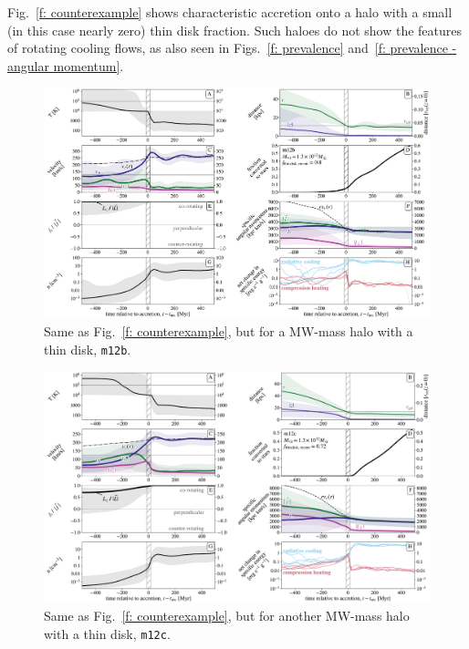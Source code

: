 \documentclass[fleqn,usenatbib]{mnras}
\begin{document}
Fig.~\ref{f: counterexample} shows characteristic accretion onto a halo with a small (in this case nearly zero) thin disk fraction.
Such haloes do not show the features of rotating cooling flows, as also seen in Figs.~\ref{f: prevalence} and~\ref{f: prevalence - angular momentum}.


\begin{figure}
\includegraphics[width=\textwidth]{figures/variations/relative_to_accretion/before_and_after/before_and_after_allone_m12b_md.pdf}
\caption{
Same as Fig.~\ref{f: counterexample}, but for a MW-mass halo with a thin disk, \texttt{m12b}.
}
\label{f: before and after m12b}
\end{figure}

\begin{figure}
\includegraphics[width=\textwidth]{figures/variations/relative_to_accretion/before_and_after/before_and_after_allone_m12c_md.pdf}
\caption{
Same as Fig.~\ref{f: counterexample}, but for another MW-mass halo with a thin disk, \texttt{m12c}.
}
\label{f: before and after m12c}
\end{figure}
\end{document}
